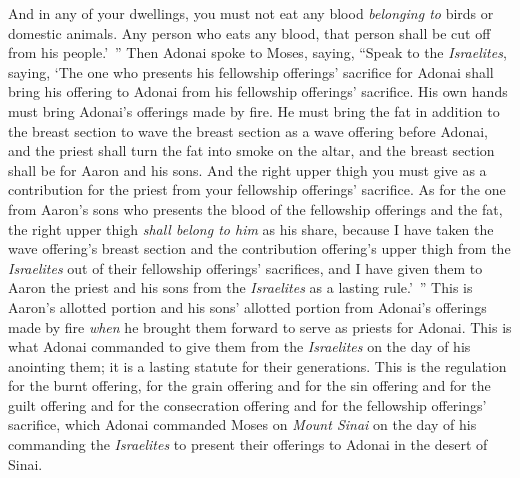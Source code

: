 \begin{biblechapter}
\verse And in any of your dwellings, you must not eat any blood \textit{belonging to} birds or domestic animals.
\verse Any person who eats any blood, that person shall be cut off from his people.’ ”
 Then Adonai spoke to Moses, saying,
\verse “Speak to the \textit{Israelites}, saying, ‘The one who presents his fellowship offerings’ sacrifice for Adonai shall bring his offering to Adonai from his fellowship offerings’ sacrifice.
\verse His own hands must bring Adonai’s offerings made by fire. He must bring the fat in addition to the breast section to wave the breast section as a wave offering before Adonai,
\verse and the priest shall turn the fat into smoke on the altar, and the breast section shall be for Aaron and his sons.
\verse And the right upper thigh you must give as a contribution for the priest from your fellowship offerings’ sacrifice.
\verse As for the one from Aaron’s sons who presents the blood of the fellowship offerings and the fat, the right upper thigh \textit{shall belong to him} as his share,
\verse because I have taken the wave offering’s breast section and the contribution offering’s upper thigh from the \textit{Israelites} out of their fellowship offerings’ sacrifices, and I have given them to Aaron the priest and his sons from the \textit{Israelites} as a lasting rule.’ ”
\verse This is Aaron’s allotted portion and his sons’ allotted portion from Adonai’s offerings made by fire \textit{when} he brought them forward to serve as priests for Adonai.
\verse This is what Adonai commanded to give them from the \textit{Israelites} on the day of his anointing them; it is a lasting statute for their generations.
 This is the regulation for the burnt offering, for the grain offering and for the sin offering and for the guilt offering and for the consecration offering and for the fellowship offerings’ sacrifice,
\verse which Adonai commanded Moses on \textit{Mount Sinai} on the day of his commanding the \textit{Israelites} to present their offerings to Adonai in the desert of Sinai.
\end{biblechapter}

